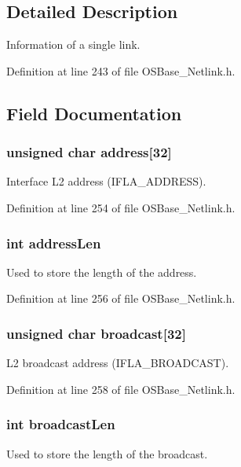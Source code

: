 \subsection{Detailed Description}
Information of a single link. 

Definition at line 243 of file OSBase\_\-Netlink.h.

\subsection{Field Documentation}
\hypertarget{structnl_link_info_a47f1d37ed4036597b5349643cdf0ee95}{
\subsubsection[{address}]{\setlength{\rightskip}{0pt plus 5cm}unsigned char {\bf address}\mbox{[}32\mbox{]}}}
\label{structnl_link_info_a47f1d37ed4036597b5349643cdf0ee95}
Interface L2 address (IFLA\_\-ADDRESS). 

Definition at line 254 of file OSBase\_\-Netlink.h.\hypertarget{structnl_link_info_a40ac8032a304ec8c7e75994741c59674}{
\subsubsection[{addressLen}]{\setlength{\rightskip}{0pt plus 5cm}int {\bf addressLen}}}
\label{structnl_link_info_a40ac8032a304ec8c7e75994741c59674}
Used to store the length of the address. 

Definition at line 256 of file OSBase\_\-Netlink.h.\hypertarget{structnl_link_info_a67a214db57ca3f0cf9379b5a2d7f5af5}{
\subsubsection[{broadcast}]{\setlength{\rightskip}{0pt plus 5cm}unsigned char {\bf broadcast}\mbox{[}32\mbox{]}}}
\label{structnl_link_info_a67a214db57ca3f0cf9379b5a2d7f5af5}
L2 broadcast address (IFLA\_\-BROADCAST). 

Definition at line 258 of file OSBase\_\-Netlink.h.\hypertarget{structnl_link_info_a7be8940ebbe48647e242987fef72d3bd}{
\subsubsection[{broadcastLen}]{\setlength{\rightskip}{0pt plus 5cm}int {\bf broadcastLen}}}
\label{structnl_link_info_a7be8940ebbe48647e242987fef72d3bd}
Used to store the length of the broadcast. 

